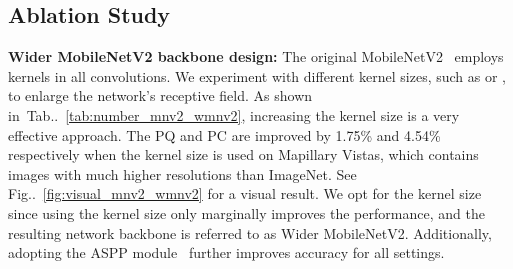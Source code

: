 \documentclass[10pt,twocolumn,letterpaper]{article}
\makeatletter
\def\@onedot{\ifx\@let@token.\else.\null\fi\xspace}
\DeclareRobustCommand\onedot{\futurelet\@let@token\@onedot}
\newcommand{\figref}[1]{Fig\onedot~\ref{#1}}
\newcommand{\tabref}[1]{Tab\onedot~\ref{#1}}
\makeatother
\begin{document}
\subsection{Ablation Study}
\label{subsec:ablation_study}

{\bf Wider MobileNetV2 backbone design:} The original MobileNetV2~\cite{mobilenetv22018} employs  kernels in all convolutions. We experiment with different kernel sizes, such as  or , to enlarge the network's receptive field. As shown in~\tabref{tab:number_mnv2_wmnv2}, increasing the kernel size is a very effective approach. The PQ and PC are improved by 1.75\% and 4.54\% respectively when the  kernel size is used on Mapillary Vistas, which contains images with much higher resolutions than ImageNet. See \figref{fig:visual_mnv2_wmnv2} for a visual result. We opt for the  kernel size since using the  kernel size only marginally improves the performance, and the resulting network backbone is referred to as Wider MobileNetV2. Additionally, adopting the ASPP module~\cite{chen2017rethinking} further improves accuracy for all settings.

\begin{table}[!t]
  \centering
  \caption{The comparison between different Wider MobileNetV2 designs. Employing a larger kernel size in all the convolutions of MobileNetV2 significantly improves the accuracy on Mapillary Vistas, where the images have much larger resolutions than ImageNet. Moreover, the ASPP module is effective for all settings.}
  \label{tab:number_mnv2_wmnv2}
\end{table}
\end{document}
